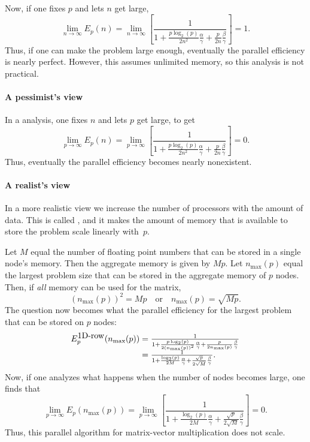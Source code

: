 Now, if one fixes $ p $ and lets $ n $ get large,
\[
\lim_{n \rightarrow \infty} E_p( n ) =
\lim_{n \rightarrow \infty}
\left[
\frac{1}
{ 1 + \frac{p \log_2(p)}{2 n^2} \frac{\alpha}{\gamma} 
+ \frac{p}{2 n} \frac{\beta}{\gamma} }
\right]
=
1.
\]
Thus, if one can make the problem large enough, eventually the parallel
efficiency is nearly perfect. However, this assumes unlimited memory,
so this analysis is not practical.



\paragraph*{A pessimist's view}

In a  analysis,
one fixes $ n $ and lets $ p $ get large, to get
\[
\lim_{p \rightarrow \infty} E_p( n ) =
\lim_{p \rightarrow \infty}
\left[
\frac{1}
{1 + \frac{p \log_2(p)}{2 n^2} \frac{\alpha}{\gamma} 
+ \frac{p}{2 n} \frac{\beta}{\gamma} }
\right]
=
0.
\]
Thus, eventually the parallel efficiency becomes nearly nonexistent.

\paragraph*{A realist's view}

In a more realistic view we increase the number of processors with the
amount of data. This is called , and 
it makes the amount of memory that is available to
store the problem scale linearly with~$ p $.  

Let $ M $ equal the
number of floating point numbers that can be stored in a single node's
memory.  Then the aggregate memory is given by $ M p $.  Let $
n_{\max}(p) $ equal the largest problem size that can be stored
in the aggregate memory of $ p $ nodes.  Then, if {\em all} memory can
be used for the matrix,
\[
(n_{\max}(p))^2 = M p
\quad
\mbox{or}
\quad
n_{\max}(p) = \sqrt{Mp}.
\]
The question now becomes what the parallel 
efficiency for the largest problem that can be stored on $ p $ nodes:
\[ 
\begin{array}{r@{{}={}}l}
E_p^{\mbox{1D-row}}(n_{\max}(p)) &
\frac{1}
{1 + \frac{p \log_2(p)}{2 (n_{\max}(p))^2} \frac{\alpha}{\gamma} 
+ \frac{p}{2 n_{\max}(p)} \frac{\beta}{\gamma} }
\\
&
\frac{1}
{ 1 + \frac{\log_2(p)}{2 M} \frac{\alpha}{\gamma} 
+ \frac{\sqrt{p}}{2 \sqrt{M}} \frac{\beta}{\gamma} }.
\end{array}
\]
Now, if one analyzes what happens when the number of nodes
becomes large, one finds that
\[
\lim_{p \rightarrow \infty} E_p( n_{\max}(p) ) 
=
\lim_{p \rightarrow \infty}
\left[
\frac{1}
{1 + \frac{\log_2(p)}{2 M} \frac{\alpha}{\gamma} 
+ \frac{\sqrt{p}}{2 \sqrt{M}} \frac{\beta}{\gamma} }
\right]
=
0.
\]
Thus, this parallel algorithm for matrix-vector multiplication does
not scale. 


